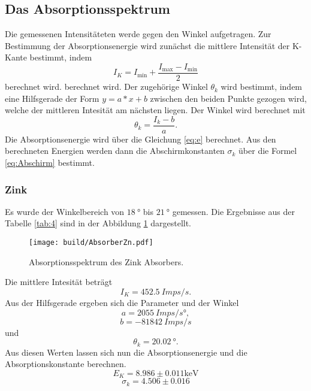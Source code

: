 \subsection{Das Absorptionsspektrum}
Die gemessenen Intensitäteten werde gegen den Winkel aufgetragen.
Zur Bestimmung der Absorptionsenergie wird zunächst die mittlere Intensität der K-Kante bestimmt, indem 
\begin{equation}
    I_K = I_\text{min} + \frac{I_\text{max}- I_\text{min}}{2}
\end{equation}
berechnet wird.
\noindent berechnet wird. 
Der zugehörige Winkel $\theta_k$ wird bestimmt, indem eine Hilfsgerade der Form $y = a * x + b$ zwischen den beiden Punkte gezogen wird, welche der mittleren Intesität am nächsten liegen.
Der Winkel wird berechnet mit 
\begin{equation}
    \theta_k = \frac{I_k - b}{a}.
\end{equation}
Die Absorptionsenergie wird über die Gleichung \ref{eq:e} berechnet.
Aus den berechneten Energien werden dann die Abschirmkonstanten $\sigma_k$ über die Formel \ref{eq:Abschirm} bestimmt.


\subsubsection{Zink}
Es wurde der Winkelbereich von $\qty{18}{°}$ bis $\qty{21}{°}$ gemessen. 
Die Ergebnisse aus der Tabelle \ref{tab:4} sind in der Abbildung \ref{fig:AbZn} dargestellt.
\begin{figure}[H]
    \centering
    \texttt{[image: build/AbsorberZn.pdf]}
    \caption{Absorptionsspektrum des Zink Absorbers.}
    \label{fig:AbZn}
\end{figure}
Die mittlere Intesität beträgt
\begin{equation*}
    I_K = \qty{452.5}{Imps/s}.
\end{equation*}
Aus der Hilfsgerade ergeben sich die Parameter und der Winkel
\begin{equation*}
    a = \qty{2055}{Imps/s°} ,
\end{equation*}
\begin{equation*}
    b = \qty{-81842}{Imps/s}
\end{equation*}
und
\begin{equation*}
    \theta_k = \qty{20.02}{°}.
\end{equation*}
Aus diesen Werten lassen sich nun die Absorptionsenergie und die Absorptionskonstante berechnen.
\begin{equation*}
    E_K = 8.986 \pm 0.011\unit{\kilo\electronvolt}
\end{equation*}
\begin{equation*}
    \sigma_k = 4.506 \pm 0.016
\end{equation*}


